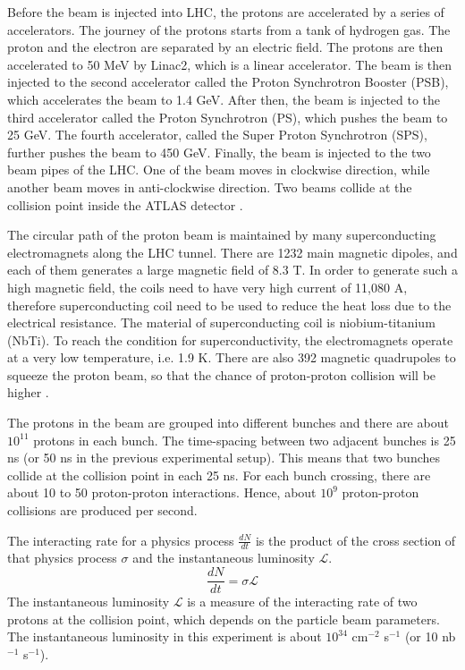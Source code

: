 Before the beam is injected into LHC, the protons are accelerated by a series of accelerators.
The journey of the protons starts from a tank of hydrogen gas.
The proton and the electron are separated by an electric field.
The protons are then accelerated to 50 MeV by Linac2, which is a linear accelerator.
The beam is then injected to the second accelerator called the Proton Synchrotron Booster (PSB), which accelerates the beam to 1.4 GeV.
After then, the beam is injected to the third accelerator called the Proton Synchrotron (PS), which pushes the beam to 25 GeV.
The fourth accelerator, called the Super Proton Synchrotron (SPS), further pushes the beam to 450 GeV.
Finally, the beam is injected to the two beam pipes of the LHC.
One of the beam moves in clockwise direction, while another beam moves in anti-clockwise direction.
Two beams collide at the collision point inside the ATLAS detector \cite{accelerator}.

The circular path of the proton beam is maintained by many superconducting electromagnets along the LHC tunnel.
There are 1232 main magnetic dipoles, and each of them generates a large magnetic field of 8.3 T.
In order to generate such a high magnetic field, the coils need to have very high current of 11,080 A, therefore superconducting coil need to be used to reduce the heat loss due to the electrical resistance.
The material of superconducting coil is niobium-titanium (NbTi).
To reach the condition for superconductivity, the electromagnets operate at a very low temperature, i.e. 1.9 K.
There are also 392 magnetic quadrupoles to squeeze the proton beam, so that the chance of proton-proton collision will be higher \cite{supermagnet,cryogenics}.

The protons in the beam are grouped into different bunches and there are about $10^{11}$ protons in each bunch.
The time-spacing between two adjacent bunches is 25 ns (or 50 ns in the previous experimental setup).
This means that two bunches collide at the collision point in each 25 ns.
For each bunch crossing, there are about 10 to 50 proton-proton interactions.
Hence, about $10^9$ proton-proton collisions are produced per second.

The interacting rate for a physics process $\frac{dN}{dt}$ is the product of the cross section of that physics process $\sigma$ and the instantaneous luminosity $\mathcal{L}$.
\begin{equation}
\frac{dN}{dt} = \sigma \mathcal{L}
\end{equation}
The instantaneous luminosity $\mathcal{L}$ is a measure of the interacting rate of two protons at the collision point, which depends on the particle beam parameters.
The instantaneous luminosity in this experiment is about $10^{34}$ cm$^{-2}$ s$^{-1}$ (or 10 nb$^{-1}$ s$^{-1}$).

